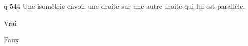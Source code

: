 \begin{truefalse}{q-544}
Une isométrie envoie une droite sur une autre droite qui lui est parallèle.
\item Vrai
\item* Faux
\end{truefalse}

